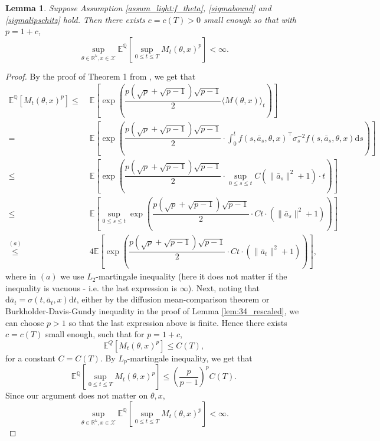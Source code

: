 \documentclass{article}
\newtheorem{lem}[thm]{Lemma}
\newcommand{\1}{\mathbbm{1}}
\newcommand{\E}{\mathbb E}
\renewcommand{\H}{\mathcal{H}}
\numberwithin{equation}{section}
\def\E{{\bf E}} \def\H{{\bf H}} \def\J{{\bf J}}
\def\E{\mathbb{E}}
\begin{document}
\begin{lem}\label{lem:Mbdd_weak} Suppose Assumption \ref{assum_light:f_theta}, \eqref{sigmabound} and \eqref{sigmalipschitz} hold. Then there exists $c=c(T)>0$ small enough so that with $p=1+c$,
$$\sup_{\theta\in \mathbb{R}^{k}, x\in \mathcal{X}}\E^{\mathbb{Q}}\left[\sup_{0\leq t\leq T}M_{t}(\theta, x)^{p}\right]<\infty.$$
\end{lem}
\begin{proof}
By the proof of Theorem 1 from \cite{grigelionis2003finiteness}, we get that
\begin{align*}
\E^{\mathbb{Q}}\left[M_{t}(\theta, x)^{p}\right]\leq&\;\E\left[\exp\left(\dfrac{p(\sqrt{p}+\sqrt{p-1})\sqrt{p-1}}{2}\langle M(\theta, x)\rangle_{t}\right)\right]\\
=&\;\E\left[\exp\left(\dfrac{p(\sqrt{p}+\sqrt{p-1})\sqrt{p-1}}{2}\cdot \int_{0}^{t}f(s, \bar a_{s}, \theta, x)^{\top}\sigma_{s}^{-2}f(s, \bar a_{s},\theta, x)\text{d}s\right)\right]\\
\leq&\;\E\left[\exp\left(\dfrac{p(\sqrt{p}+\sqrt{p-1})\sqrt{p-1}}{2}\cdot \sup_{0\leq s\leq t}C(\|\bar a_{s}\|^{2}+1)\cdot t\right)\right]\\
\leq&\;\E\left[\sup_{0\leq s\leq t}\exp\left(\dfrac{p(\sqrt{p}+\sqrt{p-1})\sqrt{p-1}}{2}\cdot Ct\cdot (\|\bar a_{s}\|^{2}+1)\right)\right]\\
\overset{(a)}\leq&\;4\E\left[\exp\left(\dfrac{p(\sqrt{p}+\sqrt{p-1})\sqrt{p-1}}{2}\cdot Ct\cdot (\|\bar a_{t}\|^{2}+1)\right)\right],
\end{align*}
where in $(a)$ we use $L_{2}$-martingale inequality (here it does not matter if the inequality is vacuous - i.e. the last expression is $\infty$). Next, noting that $\text{d}\bar a_{t}=\sigma(t, \bar a_{t},x)\text{d} t$, either by the diffusion mean-comparison theorem or Burkholder-Davis-Gundy inequality in the proof of Lemma \ref{lem:34_rescaled}, we can choose $p>1$ so that the last expression above is finite. Hence there exists $c=c(T)$ small enough, such that for $p=1+c$,
$$\E^{Q}[M_{t}(\theta, x)^{p}]\leq C(T),$$
for a constant $C=C(T)$. By $L_{p}$-martingale inequality, we get that
$$\E^{\mathbb{Q}}\left[\sup_{0\leq t\leq T}M_{t}(\theta, x)^{p}\right]\leq \left(\dfrac{p}{p-1}\right)^{p}C(T).$$
Since our argument does not matter on $\theta, x$,
$$\sup_{\theta\in \mathbb{R}^{k}, x\in \mathcal{X}}\E^{\mathbb{Q}}\left[\sup_{0\leq t\leq T}M_{t}(\theta, x)^{p}\right]<\infty.$$
\end{proof}
\end{document}
